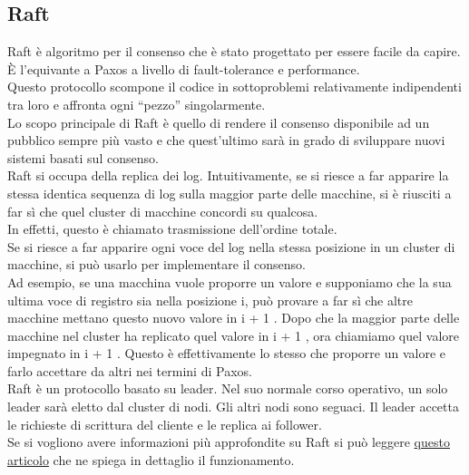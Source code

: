 \subsection{Raft}
Raft è algoritmo per il consenso che è stato progettato per essere facile da capire. È l'equivante a Paxos a livello di fault-tolerance e performance.\\
Questo protocollo scompone il codice in sottoproblemi relativamente indipendenti tra loro e affronta ogni “pezzo” singolarmente.\\
Lo scopo principale di Raft è quello di rendere il consenso disponibile ad un pubblico sempre più vasto e che quest’ultimo sarà in grado di sviluppare nuovi sistemi basati sul consenso.\\
Raft si occupa della replica dei log. Intuitivamente, se si riesce a far apparire la stessa identica sequenza di log sulla maggior parte delle macchine, si è riusciti a far sì che quel cluster di macchine concordi su qualcosa.\\
In effetti, questo è chiamato trasmissione dell'ordine totale.\\ Se si riesce a far apparire ogni voce del log nella stessa posizione in un cluster di macchine, si può usarlo per implementare il consenso. \\
Ad esempio, se una macchina vuole proporre un valore e supponiamo che la sua ultima voce di registro sia nella posizione i, può provare a far sì che altre macchine mettano questo nuovo valore in i + 1 . Dopo che la maggior parte delle macchine nel cluster ha replicato quel valore in i + 1 , ora chiamiamo quel valore impegnato in i + 1 . Questo è effettivamente lo stesso che proporre un valore e farlo accettare da altri nei termini di Paxos.\\
Raft è un protocollo basato su leader. Nel suo normale corso operativo, un solo leader sarà eletto dal cluster di nodi. Gli altri nodi sono seguaci. Il leader accetta le richieste di scrittura del cliente e le replica ai follower.\\
Se si vogliono avere informazioni più approfondite su Raft si può leggere
\href{https://ichi.pro/it/protocollo-raft-consensus-reso-piu-semplice-160718622511489}{questo articolo} che ne spiega in dettaglio il funzionamento.


